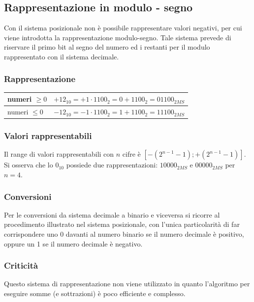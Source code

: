\documentclass[a4paper]{article}
\begin{document}
\subsection{Rappresentazione in modulo - segno}
Con il sistema posizionale non è possibile rappresentare valori negativi, per cui viene introdotta la rappresentazione
modulo-segno. Tale sistema prevede di riservare il primo bit al segno del numero ed i restanti per il modulo rappresentato
con il sistema decimale. 

\subsubsection*{Rappresentazione}
\begin{center}
	\begin{tabularx}{\textwidth}{l X}
		numeri \(\geq 0\) & \(+12_{10} = +1 \cdot 1100_2 = 0 + 1100_2 = 01100_{2MS}\) \\
		\midrule
		numeri \(\leq 0\) & \(-12_{10} = -1 \cdot 1100_2 = 1 + 1100_2 = 11100_{2MS}\)
	\end{tabularx}
\end{center}

\subsubsection*{Valori rappresentabili}
Il range di valori rappresentabili con \(n\) cifre è \(\left[- \left(2^{n - 1} - 1\right); + \left(2^{n - 1} - 1\right) \right]\). \\
Si osserva che lo \(0_{10}\) possiede due rappresentazioni: \(1 0000_{2MS}\) e \(0 0000_{2MS}\)  per \(n = 4\).
		
\subsubsection*{Conversioni}
Per le conversioni da sistema decimale a binario e viceversa si ricorre al procedimento illustrato nel sistema posizionale,
con l'unica particolarità di far corrispondere uno 0 davanti al numero binario se il numero decimale è positivo, oppure un 1
se il numero decimale è negativo.

\subsubsection*{Criticità}
Questo sistema di rappresentazione non viene utilizzato in quanto l'algoritmo per eseguire somme (e sottrazioni) è poco
efficiente e complesso.
\end{document}
